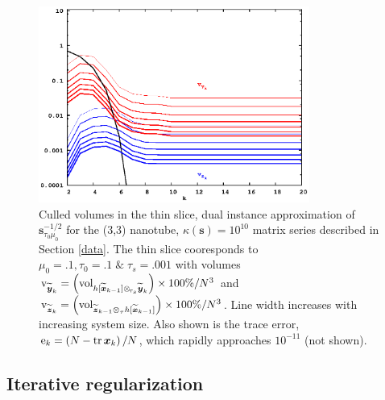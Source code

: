 \documentclass[letterpaper,twocolumn,amsmath,amsfont,amssymb,english,aps,jcp,preprintnumbers,groupaddress,nofootinbib,tightenlines,floatfix]{revtex4}
\newcommand{\mat}[1]{\boldsymbol{#1}}
\newcommand{\ot}{  {\scriptstyle \otimes}_{ \tau } }
\newcommand{\ots}{ {\scriptstyle \otimes}_{ \! \tau_s } }
\theoremstyle{plain}
\theoremstyle{remark}
\theoremstyle{plain}
\begin{document}
\begin{figure}[h]\label{regularized_dual}
 \includegraphics[width=3.5in]{fig_33_tube_cond_10_regularized/33_tube_k10_regularized_dual.eps}
\caption{
Culled volumes in the thin slice, dual instance approximation of $\mat{s}^{-1/2}_{\tau_0 \mu_0}$
for the (3,3) nanotube, $\kappa(\mat{s})=10^{10}$ matrix series 
described in Section \ref{data}. The thin slice cooresponds to $\mu_0=.1, \tau_0=.1 \;  \&  \; \tau_s=.001$ 
with volumes 
${\rm v}_{\widetilde{\mat{y}}_k}= \left( {\rm vol}_{  h[\widetilde{\mat{x}}_{k-1}] \ots \widetilde{\mat{y}}_k }  \right) \times 100\% /N^3$ and  
${\rm v}_{\widetilde{\mat{z}}_k}= \left( {\rm vol}_{\widetilde{\mat{z}}_{k-1} \ot  h[\widetilde{\mat{x}}_{k-1}]} \right) \times 100\% /N^3$.
Line width increases with increasing system size. 
Also shown is the trace error, ${\rm e}_{k} = \left( N-{\rm tr}\,\mat{x}_k \right)/N$, which rapidly approaches $10^{-11}$ (not shown). }
\end{figure} 


\subsection{Iterative regularization}
\end{document}
